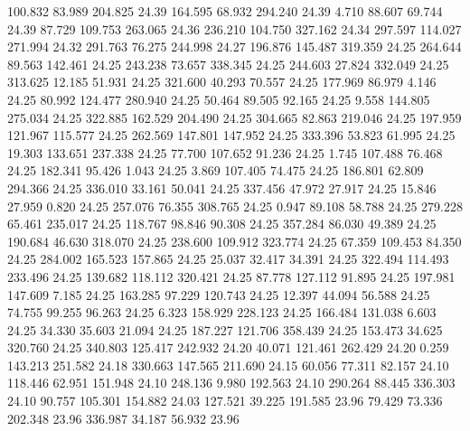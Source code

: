  100.832   83.989  204.825        24.39
 164.595   68.932  294.240        24.39
   4.710   88.607   69.744        24.39
  87.729  109.753  263.065        24.36
 236.210  104.750  327.162        24.34
 297.597  114.027  271.994        24.32
 291.763   76.275  244.998        24.27
 196.876  145.487  319.359        24.25
 264.644   89.563  142.461        24.25
 243.238   73.657  338.345        24.25
 244.603   27.824  332.049        24.25
 313.625   12.185   51.931        24.25
 321.600   40.293   70.557        24.25
 177.969   86.979    4.146        24.25
  80.992  124.477  280.940        24.25
  50.464   89.505   92.165        24.25
   9.558  144.805  275.034        24.25
 322.885  162.529  204.490        24.25
 304.665   82.863  219.046        24.25
 197.959  121.967  115.577        24.25
 262.569  147.801  147.952        24.25
 333.396   53.823   61.995        24.25
  19.303  133.651  237.338        24.25
  77.700  107.652   91.236        24.25
   1.745  107.488   76.468        24.25
 182.341   95.426    1.043        24.25
   3.869  107.405   74.475        24.25
 186.801   62.809  294.366        24.25
 336.010   33.161   50.041        24.25
 337.456   47.972   27.917        24.25
  15.846   27.959    0.820        24.25
 257.076   76.355  308.765        24.25
   0.947   89.108   58.788        24.25
 279.228   65.461  235.017        24.25
 118.767   98.846   90.308        24.25
 357.284   86.030   49.389        24.25
 190.684   46.630  318.070        24.25
 238.600  109.912  323.774        24.25
  67.359  109.453   84.350        24.25
 284.002  165.523  157.865        24.25
  25.037   32.417   34.391        24.25
 322.494  114.493  233.496        24.25
 139.682  118.112  320.421        24.25
  87.778  127.112   91.895        24.25
 197.981  147.609    7.185        24.25
 163.285   97.229  120.743        24.25
  12.397   44.094   56.588        24.25
  74.755   99.255   96.263        24.25
   6.323  158.929  228.123        24.25
 166.484  131.038    6.603        24.25
  34.330   35.603   21.094        24.25
 187.227  121.706  358.439        24.25
 153.473   34.625  320.760        24.25
 340.803  125.417  242.932        24.20
  40.071  121.461  262.429        24.20
   0.259  143.213  251.582        24.18
 330.663  147.565  211.690        24.15
  60.056   77.311   82.157        24.10
 118.446   62.951  151.948        24.10
 248.136    9.980  192.563        24.10
 290.264   88.445  336.303        24.10
  90.757  105.301  154.882        24.03
 127.521   39.225  191.585        23.96
  79.429   73.336  202.348        23.96
 336.987   34.187   56.932        23.96
